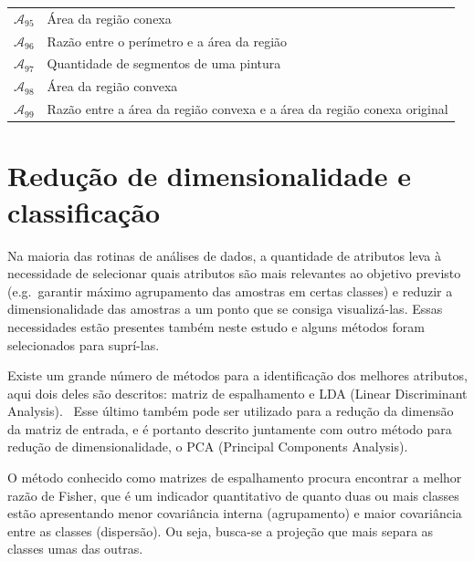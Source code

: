 \begin{table}
\begin{center}
\begin{tabular}{l|l}
    $\mathcal{A}_{95}$ &
    Área da região conexa \\

    $\mathcal{A}_{96}$ &
    Razão entre o perímetro e a área da região \\

    $\mathcal{A}_{97}$ &
    Quantidade de segmentos de uma pintura \\

    $\mathcal{A}_{98}$ &
    Área da região convexa \\

    $\mathcal{A}_{99}$ &
    Razão entre a área da região convexa e a área da região conexa original \\

    \hline
    \end{tabular}
    \fonteminha
  \end{center}
\end{table}

\section{Redução de dimensionalidade e classificação}
\label{sec:fund:reducao}

Na maioria das rotinas de análises de dados, a quantidade de atributos leva à
necessidade de selecionar quais atributos são mais relevantes ao objetivo
previsto (e.g.\ garantir máximo agrupamento das amostras em certas classes) e
reduzir a dimensionalidade das amostras a um ponto que se consiga
visualizá-las. Essas necessidades estão presentes também neste estudo e alguns
métodos foram selecionados para suprí-las.

Existe um grande número de métodos para a identificação dos melhores atributos,
aqui dois deles são descritos: matriz de espalhamento e LDA (Linear Discriminant
Analysis).~\cite{fisher,luciano,jain} Esse último também
pode ser utilizado para a redução da dimensão da matriz de entrada, e é portanto
descrito juntamente com outro método para redução de dimensionalidade, o PCA
(Principal Components Analysis).~\cite{luciano,dunteman}

O método conhecido como matrizes de espalhamento procura encontrar a melhor
razão de Fisher, que é um indicador quantitativo de quanto duas ou mais classes
estão apresentando menor covariância interna (agrupamento) e maior covariância
entre as classes (dispersão). Ou seja, busca-se a projeção que mais separa as
classes umas das outras.~\cite{fisher,luciano}

